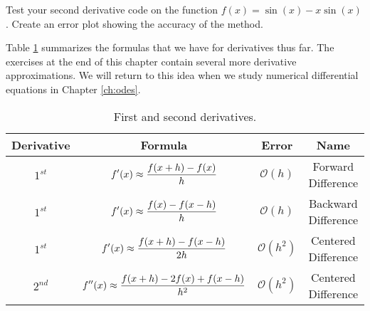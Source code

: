 \begin{problem}
    Test your second derivative code on the function $f(x) = \sin(x) - x\sin(x)$.  Create
    an error plot showing the accuracy of the method.
\end{problem}

Table \ref{tab:first_and_second_derivatives} summarizes the formulas that we have for
derivatives thus far. The exercises at the end of this chapter contain several more
derivative approximations.  We will return to this idea when we study numerical
differential equations in Chapter \ref{ch:odes}.
\begin{table}
    \centering
    \begin{tabular}{|c|c|c|c|}
        \hline
        Derivative & Formula & Error & Name \\ \hline \hline
        $1^{st}$ & $\displaystyle f'(x) \approx \frac{f(x+h) - f(x)}{h}$ & $\mathcal{O}(h)$ & Forward
        Difference \\ \hline
        $1^{st}$ & $\displaystyle f'(x) \approx \frac{f(x) - f(x-h)}{h}$ & $\mathcal{O}(h)$ & Backward
        Difference \\ \hline
        $1^{st}$ & $\displaystyle f'(x) \approx \frac{f(x+h) - f(x-h)}{2h}$ & $\mathcal{O}(h^2)$ &
        Centered Difference \\ \hline
        $2^{nd}$ & $\displaystyle f''(x) \approx \frac{f(x+h) - 2f(x) + f(x-h)}{h^2}$ &
        $\mathcal{O}(h^2)$ & Centered Difference \\ \hline
    \end{tabular}
    \caption{First and second derivatives.}
    \label{tab:first_and_second_derivatives}
\end{table}




